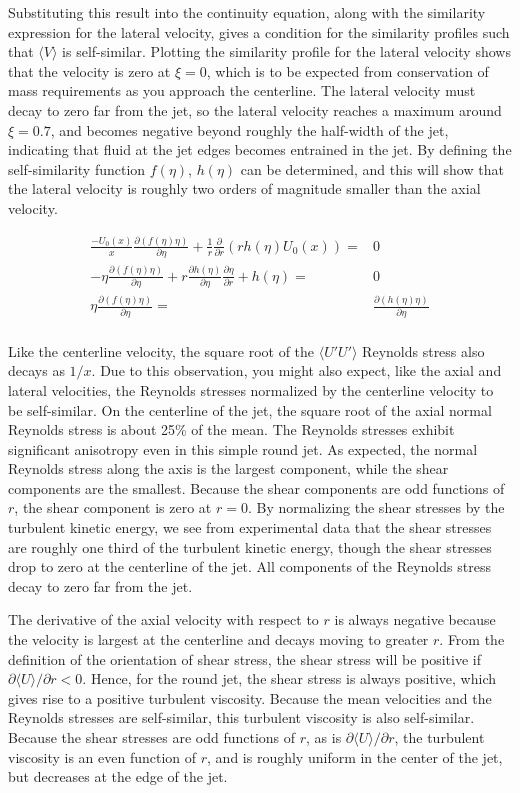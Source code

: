 \documentclass[10pt]{article}
\newcommand{\beqa}{\begin{equation}\begin{aligned}}
\newcommand{\eeqa}{\end{aligned}\end{equation}}
\newcommand{\la}{\langle}
\newcommand{\ra}{\rangle}
\begin{document}
\begin{flushleft}
Substituting this result into the continuity equation, along with the similarity expression for the lateral velocity, gives a condition for the similarity profiles such that \(\la V\ra\) is self-similar. Plotting the similarity profile for the lateral velocity shows that the velocity is zero at \(\xi=0\), which is to be expected from conservation of mass requirements as you approach the centerline. The lateral velocity must decay to zero far from the jet, so the lateral velocity reaches a maximum around \(\xi=0.7\), and becomes negative beyond roughly the half-width of the jet, indicating that fluid at the jet edges becomes entrained in the jet. By defining the self-similarity function \(f(\eta)\), \(h(\eta)\) can be determined, and this will show that the lateral velocity is roughly two orders of magnitude smaller than the axial velocity. 

\beqa
\frac{-U_0(x)}{x}\frac{\partial (f(\eta)\eta)}{\partial\eta}+\frac{1}{r}\frac{\partial}{\partial r}\left(rh(\eta)U_0(x)\right)=&0\\
-\eta\frac{\partial (f(\eta)\eta)}{\partial\eta}+r\frac{\partial h(\eta)}{\partial \eta}\frac{\partial\eta}{\partial r}+h(\eta)=&0\\
\eta\frac{\partial (f(\eta)\eta)}{\partial\eta}=&\frac{\partial (h(\eta)\eta)}{\partial \eta}\\
\eeqa

Like the centerline velocity, the square root of the \(\la U'U'\ra\) Reynolds stress also decays as \(1/x\). Due to this observation, you might also expect, like the axial and lateral velocities, the Reynolds stresses normalized by the centerline velocity to be self-similar. On the centerline of the jet, the square root of the axial normal Reynolds stress is about 25\% of the mean. The Reynolds stresses exhibit significant anisotropy even in this simple round jet. As expected, the normal Reynolds stress along the axis is the largest component, while the shear components are the smallest. Because the shear components are odd functions of \(r\), the shear component is zero at \(r=0\). By normalizing the shear stresses by the turbulent kinetic energy, we see from experimental data that the shear stresses are roughly one third of the turbulent kinetic energy, though the shear stresses drop to zero at the centerline of the jet. All components of the Reynolds stress decay to zero far from the jet.

The derivative of the axial velocity with respect to \(r\) is always negative because the velocity is largest at the centerline and decays moving to greater \(r\). From the definition of the orientation of shear stress, the shear stress will be positive if \(\partial\la U\ra/\partial r<0\). Hence, for the round jet, the shear stress is always positive, which gives rise to a positive turbulent viscosity. Because the mean velocities and the Reynolds stresses are self-similar, this turbulent viscosity is also self-similar. Because the shear stresses are odd functions of \(r\), as is \(\partial\la U\ra/\partial r\), the turbulent viscosity is an even function of \(r\), and is roughly uniform in the center of the jet, but decreases at the edge of the jet. 






\end{flushleft}
\end{document}
